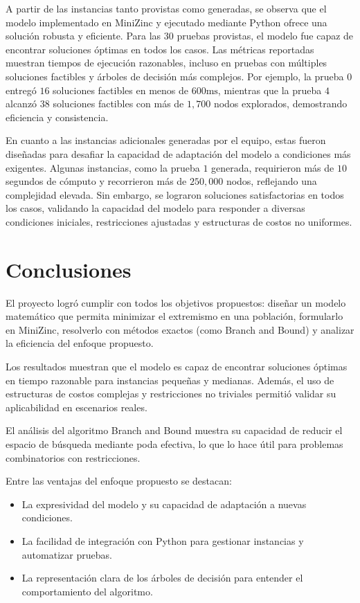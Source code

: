 A partir de las instancias tanto provistas como generadas, se observa que el modelo implementado en MiniZinc y ejecutado mediante Python ofrece una solución robusta y eficiente. Para las $30$ pruebas provistas, el modelo fue capaz de encontrar soluciones óptimas en todos los casos. Las métricas reportadas muestran tiempos de ejecución razonables, incluso en pruebas con múltiples soluciones factibles y árboles de decisión más complejos. Por ejemplo, la prueba $0$ entregó $16$ soluciones factibles en menos de $600 \text{ms}$, mientras que la prueba $4$ alcanzó $38$ soluciones factibles con más de $1,700$ nodos explorados, demostrando eficiencia y consistencia.

En cuanto a las instancias adicionales generadas por el equipo, estas fueron diseñadas para desafiar la capacidad de adaptación del modelo a condiciones más exigentes. Algunas instancias, como la prueba $1$ generada, requirieron más de $10$ segundos de cómputo y recorrieron más de $250,000$ nodos, reflejando una complejidad elevada. Sin embargo, se lograron soluciones satisfactorias en todos los casos, validando la capacidad del modelo para responder a diversas condiciones iniciales, restricciones ajustadas y estructuras de costos no uniformes.

\section{Conclusiones}

El proyecto logró cumplir con todos los objetivos propuestos: diseñar un modelo matemático que permita minimizar el extremismo en una población, formularlo en MiniZinc, resolverlo con métodos exactos (como Branch and Bound) y analizar la eficiencia del enfoque propuesto.

Los resultados muestran que el modelo es capaz de encontrar soluciones óptimas en tiempo razonable para instancias pequeñas y medianas. Además, el uso de estructuras de costos complejas y restricciones no triviales permitió validar su aplicabilidad en escenarios reales.

El análisis del algoritmo Branch and Bound muestra su capacidad de reducir el espacio de búsqueda mediante poda efectiva, lo que lo hace útil para problemas combinatorios con restricciones.

Entre las ventajas del enfoque propuesto se destacan:

\begin{itemize}
	\item La expresividad del modelo y su capacidad de adaptación a nuevas condiciones.

	\item La facilidad de integración con Python para gestionar instancias y automatizar pruebas.

	\item La representación clara de los árboles de decisión para entender el comportamiento del algoritmo.
\end{itemize}


